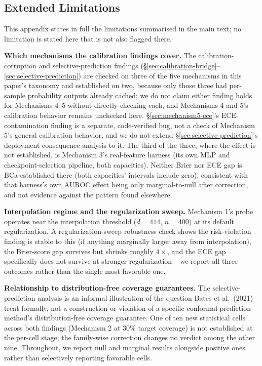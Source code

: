 \documentclass{article}
\begin{document}
\subsection{Extended Limitations}
\label{app:limitations}

This appendix states in full the limitations summarised in the main text; no
limitation is stated here that is not also flagged there.

\textbf{Which mechanisms the calibration findings cover.} The
calibration-corruption and selective-prediction findings
(\S\ref{sec:calibration-bridge}--\ref{sec:selective-prediction}) are checked on
three of the five mechanisms in this paper's taxonomy and established on two,
because only those three had per-sample probability outputs already cached;
we do not claim either finding holds for Mechanisms 4--5 without directly
checking each, and Mechanisms 4 and 5's calibration behavior remains unchecked
here. \S\ref{sec:mechanism5-ece}'s ECE-contamination finding is a separate,
code-verified bug, not a check of Mechanism 5's general calibration behavior,
and we do not extend \S\ref{sec:selective-prediction}'s deployment-consequence
analysis to it. The third of the three, where the effect is not
established, is Mechanism 3's real-feature harness (its own MLP and
checkpoint-selection pipeline, both capacities). Neither Brier nor ECE gap is BCa-established there (both
capacities' intervals include zero), consistent with that harness's own AUROC
effect being only marginal-to-null after correction, and not evidence against
the pattern found elsewhere.

\textbf{Interpolation regime and the regularization sweep.} Mechanism 1's probe
operates near the interpolation threshold ($d=414$, $n=400$) at its default
regularization. A regularization-sweep robustness check shows the
risk-violation finding is stable to this (if anything marginally larger away
from interpolation), the Brier-score gap survives but shrinks roughly
$4\times$, and the ECE gap specifically does not survive at stronger
regularization -- we report all three outcomes rather than the single most
favorable one.

\textbf{Relationship to distribution-free coverage guarantees.} The
selective-prediction analysis is an informal illustration of the question
Bates et al.\ (2021) treat formally, not a construction or violation of a
specific conformal-prediction method's distribution-free coverage guarantee.
One of ten new statistical cells across both findings (Mechanism 2 at $30\%$
target coverage) is not established at the per-cell stage; the family-wise
correction changes no verdict among the other nine. Throughout, we
report null and marginal results alongside positive ones rather than
selectively reporting favorable cells.
\end{document}
